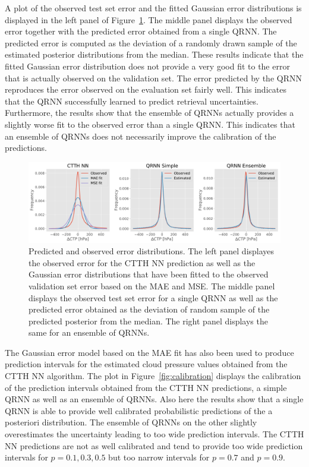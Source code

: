 \documentclass[journal abbreviation, manuscript]{copernicus}
\begin{document}
A plot of the observed test set error and the fitted Gaussian error
distributions is displayed in the left panel of Figure~\ref{fig:error_fit}. The
middle panel displays the observed error together with the predicted error
obtained from a single QRNN. The predicted error is computed as the deviation of
a randomly drawn sample of the estimated posterior distributions from the
median. These results indicate that the fitted Gaussian error distribution does
not provide a very good fit to the error that is actually observed on the
validation set. The error predicted by the QRNN reproduces the error observed on
the evaluation set fairly well. This indicates that the QRNN successfully
learned to predict retrieval uncertainties. Furthermore, the results show that
the ensemble of QRNNs actually provides a slightly worse fit to the observed
error than a single QRNN. This indicates that an ensemble of QRNNs does not
necessarily improve the calibration of the predictions.

  \begin{figure}[hbpt!]
    \centering
    \includegraphics[width = 0.8\linewidth]{../plots/ctp_error_fit}
    \caption{Predicted and observed error distributions. The left panel
      displayes the observed error for the CTTH NN prediction as well as the
      Gaussian error distributions that have been fitted to the observed
      validation set error based on the MAE and MSE. The middle panel
      displays the observed test set error for a single QRNN as well as the
      predicted error obtained as the deviation of random sample of the
      predicted posterior from the median. The right panel displays
      the same for an ensemble of QRNNs.}
    \label{fig:error_fit}
  \end{figure}

The Gaussian error model based on the MAE fit has also been used to produce
prediction intervals for the estimated cloud pressure values obtained from the
CTTH NN algorithm. The plot in Figure~\ref{fig:calibration} displays the
calibration of the prediction intervals obtained from the CTTH NN predictions,
a simple QRNN as well as an ensemble of QRNNs. Also here the results show that
a single QRNN is able to provide well calibrated probabilistic predictions of
the a posteriori distribution. The ensemble of QRNNs on the other slightly
overestimates the uncertainty leading to too wide prediction intervals. The
CTTH NN predictions are not as well calibrated and tend to provide too wide
prediction intervals for $p = 0.1, 0.3, 0.5$ but too narrow intervals for $p =
0.7$ and $p = 0.9$.
\end{document}
